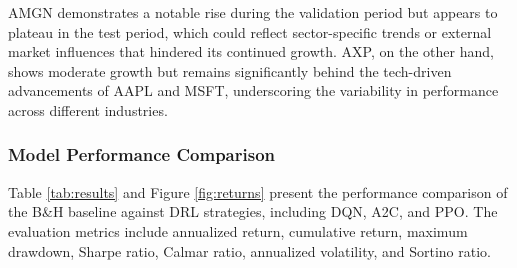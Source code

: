 \documentclass[conference]{IEEEtran}
\begin{document}
AMGN demonstrates a notable rise during the validation period but appears to plateau in the test period, which could reflect sector-specific trends or external market influences that hindered its continued growth. AXP, on the other hand, shows moderate growth but remains significantly behind the tech-driven advancements of AAPL and MSFT, underscoring the variability in performance across different industries.

\subsubsection{Model Performance Comparison}

Table \ref{tab:results} and Figure \ref{fig:returns} present the performance comparison of the B\&H baseline against DRL strategies, including DQN, A2C, and PPO. The evaluation metrics include annualized return, cumulative return, maximum drawdown, Sharpe ratio, Calmar ratio, annualized volatility, and Sortino ratio.
\end{document}
